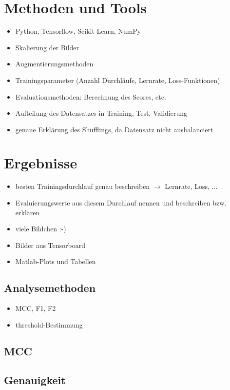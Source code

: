 \documentclass[a4paper, doc]{apa6}
\begin{document}
\section{Methoden und Tools}

\begin{itemize}
	\item Python, Tensorflow, Scikit Learn, NumPy
	\item Skalierung der Bilder
	\item Augmentierungsmethoden
	\item Trainingsparameter (Anzahl Durchläufe, Lernrate, Loss-Funktionen)
	\item Evaluationsmethoden: Berechnung des Scores, etc.
	\item Aufteilung des Datensatzes in Training, Test, Validierung
	\item genaue Erklärung des Shufflings, da Datensatz nicht ausbalanciert
\end{itemize}

\section{Ergebnisse}
\begin{itemize}
	\item besten Trainingsdurchlauf genau beschreiben $\rightarrow$ Lernrate, Loss, ...
	\item Evaluierungswerte aus diesem Durchlauf nennen und beschreiben bzw. erklären
	\item viele Bildchen :-) 
	\item Bilder aus Tensorboard
	\item Matlab-Plots und Tabellen 
\end{itemize}

\subsection{Analysemethoden}

\begin{itemize}
	\item MCC, F1, F2
	\item threshold-Bestimmung 
\end{itemize}

\subsection{MCC}

\subsection{Genauigkeit}
\end{document}
